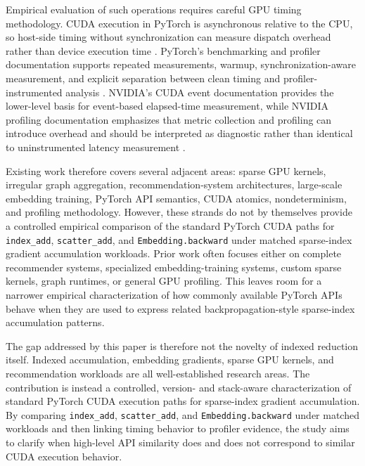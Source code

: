Empirical evaluation of such operations requires careful GPU timing methodology. CUDA execution in PyTorch is asynchronous relative to the CPU, so host-side timing without synchronization can measure dispatch overhead rather than device execution time \cite{pytorchStableCUDASemantics}. PyTorch's benchmarking and profiler documentation supports repeated measurements, warmup, synchronization-aware measurement, and explicit separation between clean timing and profiler-instrumented analysis \cite{pytorchBenchmarkRecipe,pytorchStableProfiler,pytorchProfilerRecipe}. NVIDIA's CUDA event documentation provides the lower-level basis for event-based elapsed-time measurement, while NVIDIA profiling documentation emphasizes that metric collection and profiling can introduce overhead and should be interpreted as diagnostic rather than identical to uninstrumented latency measurement \cite{nvidiaCUDAEvents,nvidiaNsightCompute}.

Existing work therefore covers several adjacent areas: sparse GPU kernels, irregular graph aggregation, recommendation-system architectures, large-scale embedding training, PyTorch API semantics, CUDA atomics, nondeterminism, and profiling methodology. However, these strands do not by themselves provide a controlled empirical comparison of the standard PyTorch CUDA paths for \texttt{index\_add}, \texttt{scatter\_add}, and \texttt{Embedding.backward} under matched sparse-index gradient accumulation workloads. Prior work often focuses either on complete recommender systems, specialized embedding-training systems, custom sparse kernels, graph runtimes, or general GPU profiling. This leaves room for a narrower empirical characterization of how commonly available PyTorch APIs behave when they are used to express related backpropagation-style sparse-index accumulation patterns.

The gap addressed by this paper is therefore not the novelty of indexed reduction itself. Indexed accumulation, embedding gradients, sparse GPU kernels, and recommendation workloads are all well-established research areas. The contribution is instead a controlled, version- and stack-aware characterization of standard PyTorch CUDA execution paths for sparse-index gradient accumulation. By comparing \texttt{index\_add}, \texttt{scatter\_add}, and \texttt{Embedding.backward} under matched workloads and then linking timing behavior to profiler evidence, the study aims to clarify when high-level API similarity does and does not correspond to similar CUDA execution behavior.